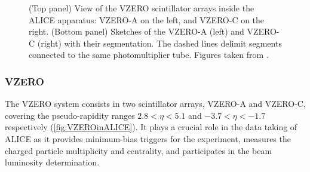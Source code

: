 \begin{figure}[b]
\centering
{}	
	\caption{(Top panel) View of the VZERO scintillator arrays inside the ALICE apparatus: VZERO-A on the left, and VZERO-C on the right. (Bottom panel) Sketches of the VZERO-A (left) and VZERO-C (right) with their segmentation. The dashed lines delimit segments connected to the same photomultiplier tube. Figures taken from \cite{alicecollaborationALICEExperimentJourney2022}\cite{alicecollaborationPerformanceALICEVZERO2013}.}
	\label{fig:VZEROdetector}
\end{figure}


\subsubsection{VZERO}
\label{subsubsec:VZERO}

The VZERO system consists in two scintillator arrays, VZERO-A and VZERO-C, covering the pseudo-rapidity ranges $2.8 < \eta < 5.1$ and $-3.7 < \eta < -1.7$ respectively (\fig\ref{fig:VZEROinALICE}). It plays a crucial role in the data taking of ALICE as it provides minimum-bias triggers for the experiment, measures the charged particle multiplicity and centrality, and participates in the beam luminosity determination.


